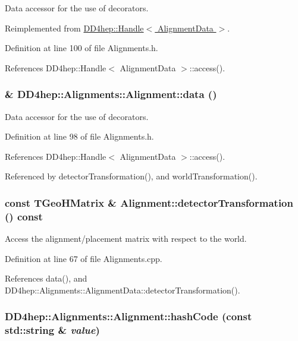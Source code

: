 Data accessor for the use of decorators. 

Reimplemented from \hyperlink{class_d_d4hep_1_1_handle_a821fe41f46aa5ce97cfb04a6a60e5cd5}{DD4hep::Handle$<$ AlignmentData $>$}.

Definition at line 100 of file Alignments.h.

References DD4hep::Handle$<$ AlignmentData $>$::access().\hypertarget{class_d_d4hep_1_1_alignments_1_1_alignment_a98f34faa8c45525335ebfae7f2506e8c}{
\subsubsection[{data}]{\& DD4hep::Alignments::Alignment::data ()}}
\label{class_d_d4hep_1_1_alignments_1_1_alignment_a98f34faa8c45525335ebfae7f2506e8c}


Data accessor for the use of decorators. 

Definition at line 98 of file Alignments.h.

References DD4hep::Handle$<$ AlignmentData $>$::access().

Referenced by detectorTransformation(), and worldTransformation().\hypertarget{class_d_d4hep_1_1_alignments_1_1_alignment_a0ea856e451cf788ed524fc9a523769c2}{
\subsubsection[{detectorTransformation}]{\setlength{\rightskip}{0pt plus 5cm}const TGeoHMatrix \& Alignment::detectorTransformation () const}}
\label{class_d_d4hep_1_1_alignments_1_1_alignment_a0ea856e451cf788ed524fc9a523769c2}


Access the alignment/placement matrix with respect to the world. 

Definition at line 67 of file Alignments.cpp.

References data(), and DD4hep::Alignments::AlignmentData::detectorTransformation().\hypertarget{class_d_d4hep_1_1_alignments_1_1_alignment_af5a53c031ebc0778ce96097696b4055c}{
\subsubsection[{hashCode}]{ DD4hep::Alignments::Alignment::hashCode (const std::string \& {\em value})}}
\label{class_d_d4hep_1_1_alignments_1_1_alignment_af5a53c031ebc0778ce96097696b4055c}


